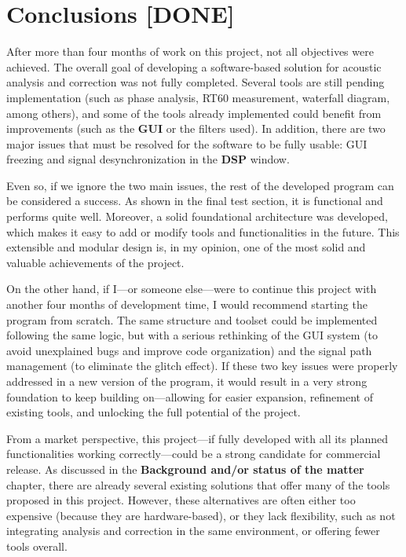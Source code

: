 \chapter{Conclusions [DONE]}

After more than four months of work on this project, not all objectives were achieved. The overall goal of developing a software-based solution for acoustic analysis and correction was not fully completed. Several tools are still pending implementation (such as phase analysis, RT60 measurement, waterfall diagram, among others), and some of the tools already implemented could benefit from improvements (such as the \textbf{GUI} or the filters used). In addition, there are two major issues that must be resolved for the software to be fully usable: GUI freezing and signal desynchronization in the \textbf{DSP} window.

Even so, if we ignore the two main issues, the rest of the developed program can be considered a success. As shown in the final test section, it is functional and performs quite well. Moreover, a solid foundational architecture was developed, which makes it easy to add or modify tools and functionalities in the future. This extensible and modular design is, in my opinion, one of the most solid and valuable achievements of the project.

On the other hand, if I—or someone else—were to continue this project with another four months of development time, I would recommend starting the program from scratch. The same structure and toolset could be implemented following the same logic, but with a serious rethinking of the GUI system (to avoid unexplained bugs and improve code organization) and the signal path management (to eliminate the glitch effect). If these two key issues were properly addressed in a new version of the program, it would result in a very strong foundation to keep building on—allowing for easier expansion, refinement of existing tools, and unlocking the full potential of the project.

From a market perspective, this project—if fully developed with all its planned functionalities working correctly—could be a strong candidate for commercial release. As discussed in the \textbf{Background and/or status of the matter} chapter, there are already several existing solutions that offer many of the tools proposed in this project. However, these alternatives are often either too expensive (because they are hardware-based), or they lack flexibility, such as not integrating analysis and correction in the same environment, or offering fewer tools overall.

